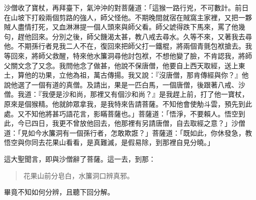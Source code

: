 沙僧收了寶杖，再拜臺下，氣沖沖的對菩薩道：「這猴一路行兇，不可數計。前日在山坡下打殺兩個剪路的強人，師父怪他。不期晚間就宿在賊窩主家裡，又把一夥賊人盡情打死，又血淋淋提一個人頭來與師父看。師父諕得跌下馬來，罵了他幾句，趕他回來。分別之後，師父饑渴太甚，教八戒去尋水。久等不來，又著我去尋他。不期孫行者見我二人不在，復回來把師父打一鐵棍，將兩個青氈包袱搶去。我等回來，將師父救醒，特來他水簾洞尋他討包袱，不想他變了臉，不肯認我，將師父關文念了又念。我問他念了做甚，他說不保唐僧，他要自上西天取經，送上東土，算他的功果，立他為祖，萬古傳揚。我又說：『沒唐僧，那肯傳經與你？』他說他選了一個有道的真僧。及請出，果是一匹白馬，一個唐僧，後跟著八戒、沙僧。我道：『我便是沙和尚，那裡又有個沙和尚？』是我趕上前，打了他一寶杖，原來是個猴精。他就帥眾拿我，是我特來告請菩薩。不知他會使觔斗雲，預先到此處。又不知他將甚巧語花言，影瞞菩薩也。」菩薩道：「悟淨，不要賴人。悟空到此，今已四日，我更不曾放他回去，他那裡有另請唐僧，自去取經之意？」沙僧道：「見如今水簾洞有一個孫行者，怎敢欺誑？」菩薩道：「既如此，你休發急，教悟空與你同去花果山看看，是真難滅，是假易除，到那裡自見分曉。」

這大聖聞言，即與沙僧辭了菩薩。這一去，到那：
\begin{quote}
花果山前分皂白，水簾洞口辨真邪。
\end{quote}

畢竟不知如何分辨，且聽下回分解。
